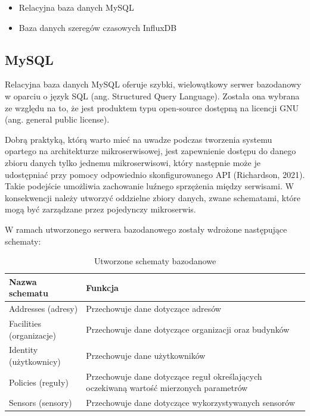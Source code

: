 \documentclass[11pt, a4]{article} %
\begin{document}
\begin{itemize} %
    \item Relacyjna baza danych MySQL
    \item Baza danych szeregów czasowych InfluxDB
\end{itemize}

\subsection{MySQL}

Relacyjna baza danych MySQL oferuje szybki, wielowątkowy serwer bazodanowy w oparciu 
o język SQL (ang. Structured Query Language). Została ona wybrana ze względu na to, że 
jest produktem typu open-source dostępną na licencji GNU (ang. general public license). 

Dobrą praktyką, którą warto mieć na uwadze podczas tworzenia systemu opartego na 
architekturze mikroserwisowej, jest zapewnienie dostępu do danego zbioru danych tylko 
jednemu mikroserwisowi, który następnie może je udostępniać przy pomocy odpowiednio 
skonfigurowanego API (Richardson, 2021). Takie podejście umożliwia zachowanie luźnego 
sprzężenia między serwisami. W konsekwencji należy utworzyć oddzielne zbiory 
danych, zwane schematami, które mogą być zarządzane przez pojedynczy mikroserwis.

W ramach utworzonego serwera bazodanowego zostały wdrożone następujące schematy:

\begin{table}[!ht]
    \caption{Utworzone schematy bazodanowe}
    \label{tab:schematy-bazodanowe}
    \begin{tabularx}{1\textwidth} { 
        | >{\raggedright\arraybackslash}X        
        | >{\raggedleft\arraybackslash}X | }
        \hline
       Nazwa schematu & Funkcja \\
       \hline
       Addresses (adresy) & 
       Przechowuje dane dotyczące adresów \\
       \hline
       Facilities (organizacje) &
       Przechowuje dane dotyczące organizacji oraz budynków \\
       \hline
       Identity (użytkownicy) &
       Przechowuje dane użytkowników \\
       \hline
       Policies (reguły) &
       Przechowuje dane dotyczące reguł określających oczekiwaną wartość mierzonych 
       parametrów \\
       \hline
       Sensors (sensory) & 
       Przechowuje dane dotyczące wykorzystywanych sensorów \\
       \hline
    \end{tabularx}
\end{table}
\end{document}
